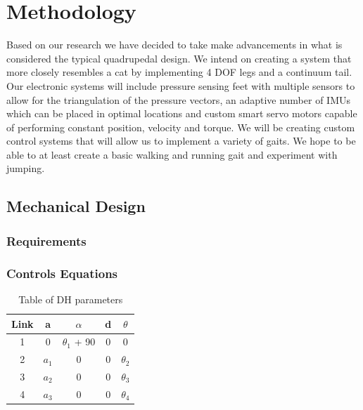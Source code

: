 \section{Methodology}
Based on our research we have decided to take make advancements in what is considered the typical quadrupedal design. We intend on creating a system that more closely resembles a cat by implementing 4 DOF legs and a continuum tail. Our electronic systems will include pressure sensing feet with multiple sensors to allow for the triangulation of the pressure vectors, an adaptive number of IMUs which can be placed in optimal locations and custom smart servo motors capable of performing constant position, velocity and torque. We will be creating custom control systems that will allow us to implement a variety of gaits. We hope to be able to at least create a basic walking and running gait and experiment with jumping.

\subsection{Mechanical Design} %
    \subsubsection{Requirements} %
     \subsubsection{Controls Equations}
     \begin{table}[H]
        \centering
        \begin{tabular}{|c|c|c|c|c|}
        \hline
            Link & a & $\alpha$ & d & $\theta$ \\
            \hline
            1 & 0 & $\theta_1$ + 90& 0& 0\\
            2 & $a_1$ & 0 & 0 &$\theta_2$ \\
            3 & $a_2$ & 0 & 0 &$\theta_3$ \\
            4 & $a_3$ & 0 & 0 &$\theta_4$ \\
            \hline
            \end{tabular}
        \caption{Table of DH parameters}
        \label{tab:my_label}
    \end{table}
    
